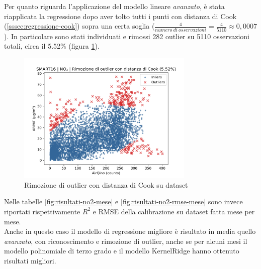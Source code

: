 Per quanto riguarda l'applicazione del modello lineare \textit{avanzato}, è stata riapplicata la regressione dopo aver tolto tutti i punti con distanza di Cook (\ref{sssec:regressione-cook}) sopra una certa soglia ($\frac{4}{numero\ di\ osservazioni} = \frac{4}{5110} \approx 0,0007$). In particolare sono stati individuati e rimossi 282 outlier su 5110 osservazioni totali, circa il 5.52\% (figura \ref{fig:cook-no2}).

\begin{figure}[H]
\centering
\includegraphics[width=0.75\textwidth,height=\textheight,keepaspectratio]{img/cook_no2.png}
\caption{Rimozione di outlier con distanza di Cook su dataset }%
\label{fig:cook-no2}%
\end{figure}

Nelle tabelle \ref{fig:risultati-no2-mese} e \ref{fig:risultati-no2-rmse-mese} sono invece riportati rispettivamente $R^2$ e RMSE della calibrazione su dataset  fatta mese per mese.\\

Anche in questo caso il modello di regressione migliore è risultato in media quello \textit{avanzato}, con riconoscimento e rimozione di outlier, anche se per alcuni mesi il modello polinomiale di terzo grado e il modello KernelRidge hanno ottenuto risultati migliori.

